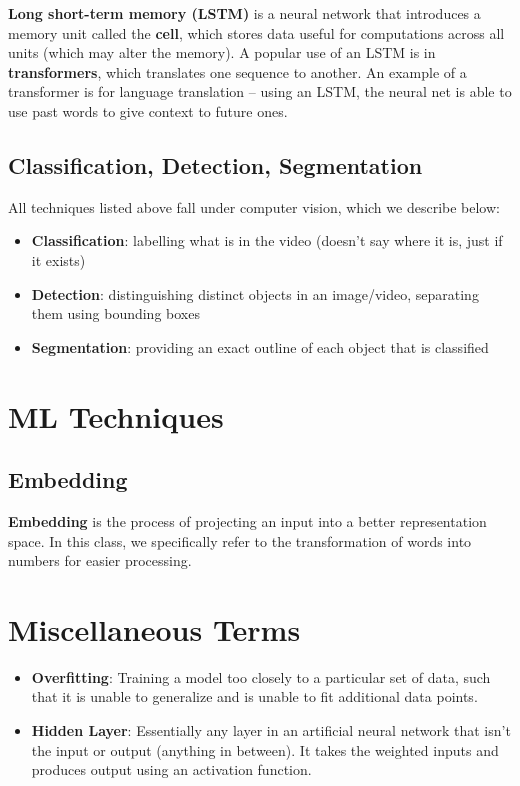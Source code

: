 \documentclass{report}
\newcommand{\npar}{\par\noindent}
\newcommand{\vpar}{\vspace{1em}\npar}
\begin{document}
\vpar \textbf{Long short-term memory (LSTM)} is a neural network that introduces a memory unit called the \textbf{cell}, which stores data useful for computations across all units (which may alter the memory). A popular use of an LSTM is in \textbf{transformers}, which translates one sequence to another. An example of a transformer is for language translation -- using an LSTM, the neural net is able to use past words to give context to future ones.

\newpage
\subsection{Classification, Detection, Segmentation}

\par All techniques listed above fall under computer vision, which we describe below:

\begin{itemize}
    \item \textbf{Classification}: labelling what is in the video (doesn't say where it is, just if it exists)
    \item \textbf{Detection}: distinguishing distinct objects in an image/video, separating them using bounding boxes
    \item \textbf{Segmentation}: providing an exact outline of each object that is classified
\end{itemize}

\section{ML Techniques}

\subsection{Embedding}

\par \textbf{Embedding} is the process of projecting an input into a better representation space. In this class, we specifically refer to the transformation of words into numbers for easier processing.

\section{Miscellaneous Terms}

\begin{itemize}
    \item \textbf{Overfitting}: Training a model too closely to a particular set of data, such that it is unable to generalize and is unable to fit additional data points.
    \item \textbf{Hidden Layer}: Essentially any layer in an artificial neural network that isn't the input or output (anything in between). It takes the weighted inputs and produces output using an activation function. 
\end{itemize}
\end{document}
